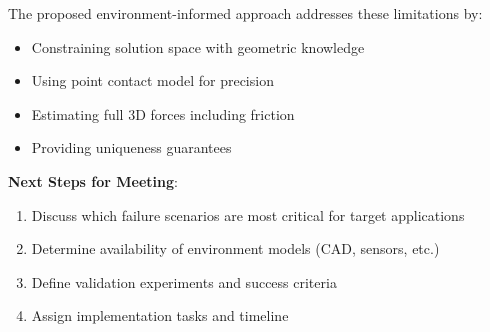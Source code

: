\documentclass[11pt]{article}
\begin{document}
The proposed environment-informed approach addresses these limitations by:
\begin{itemize}
    \item Constraining solution space with geometric knowledge
    \item Using point contact model for precision
    \item Estimating full 3D forces including friction
    \item Providing uniqueness guarantees
\end{itemize}

\textbf{Next Steps for Meeting}:
\begin{enumerate}
    \item Discuss which failure scenarios are most critical for target applications
    \item Determine availability of environment models (CAD, sensors, etc.)
    \item Define validation experiments and success criteria
    \item Assign implementation tasks and timeline
\end{enumerate}
\end{document}
